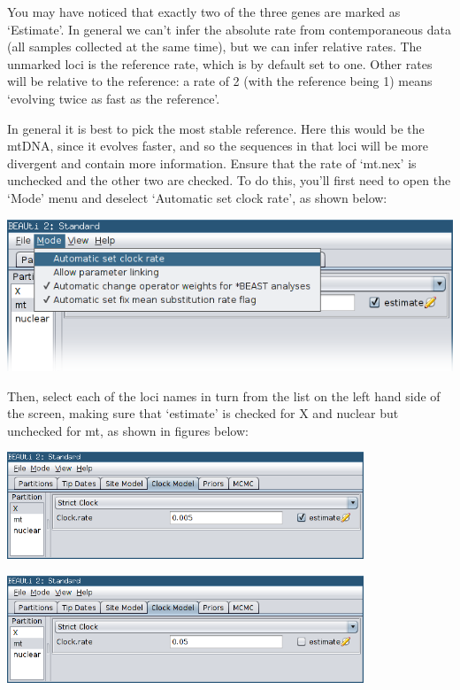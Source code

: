 \documentclass[a4paper,11pt]{article}
\begin{document}
You may have noticed that exactly two of the three genes are marked as
`Estimate'. In general we can't infer the absolute rate from contemporaneous
data (all samples collected at the same time), but we can infer relative rates.
The unmarked loci is the reference rate, which is by default set to one. Other
rates will be relative to the reference: a rate of 2 (with the reference being
1) means `evolving twice as fast as the reference'.

In general it is best to pick the most stable reference. Here this would be the
mtDNA, since it evolves faster, and so the sequences in that loci will be more
divergent and contain more information. Ensure that the rate of `mt.nex' is
unchecked and the other two are checked. To do this, you'll first need to open
the `Mode' menu and deselect `Automatic set clock rate', as shown below:

\includegraphics[width=\textwidth]{figures/clock_model.png}

Then, select each of the loci names in turn from the list on the left hand side
of the screen, making sure that `estimate' is checked for X and nuclear but
unchecked for mt, as shown in figures below:

\begin{center}
    \includegraphics[width=0.8\textwidth]{figures/clock_model2.png}
\end{center}

\begin{center}
\includegraphics[width=0.8\textwidth]{figures/clock_model3.png}
\end{center}
\end{document}
